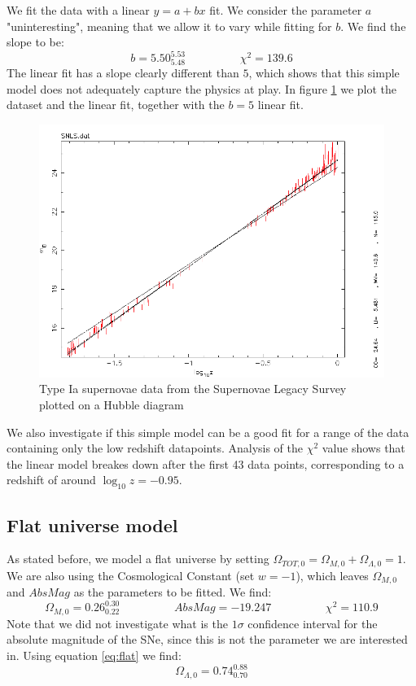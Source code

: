 \documentclass[11pt]{article}
\begin{document}
We fit the data with a linear $y = a + bx$ fit. We consider the parameter $a$ "uninteresting", meaning that we allow it to vary while fitting for $b$. We find the slope to be: 
\begin{equation}
	b = 5.50^{5.53}_{5.48} 
	\hspace{2cm}
	\chi^2 = 139.6
	\label{res:lin}
\end{equation}
The linear fit has a slope clearly different than $5$, which shows that this simple model does not adequately capture the physics at play. In figure \ref{fig:snls} we plot the dataset and the linear fit, together with the $b = 5$ linear fit. 
\begin{figure}[htbp]
	\centering
	\includegraphics[width=0.8\linewidth]{snls.png}
	\caption{Type Ia supernovae data from the Supernovae Legacy Survey plotted on a Hubble diagram}
	\label{fig:snls}
\end{figure}
We also investigate if this simple model can be a good fit for a range of the data containing only the low redshift datapoints. Analysis of the $\chi^2$ value shows that the linear model breakes down after the first 43 data points, corresponding to a redshift of around $\log_{10}z = -0.95$. 

\subsection{Flat universe model} \label{sec:flat}
As stated before, we model a flat universe by setting $\Omega_{TOT,0} = \Omega_{M,0} + \Omega_{\Lambda,0} = 1$. We are also using the Cosmological Constant (set $w = -1$), which leaves  $\Omega_{M,0}$ and $AbsMag$ as the parameters to be fitted. We find: 
\begin{equation}
	\Omega_{M,0} = 0.26^{0.30}_{0.22} 
	\hspace{2cm}
	AbsMag = -19.247
	\hspace{2cm}
	\chi^2 = 110.9
	\label{res:flatM}
\end{equation}
Note that we did not investigate what is the $1\sigma$ confidence interval for the absolute magnitude of the SNe, since this is not the parameter we are interested in. Using equation \eqref{eq:flat} we find: 
\begin{equation}
	\Omega_{\Lambda,0} = 0.74^{0.88}_{0.70} 
	\label{res:flatL}
\end{equation}
\end{document}

